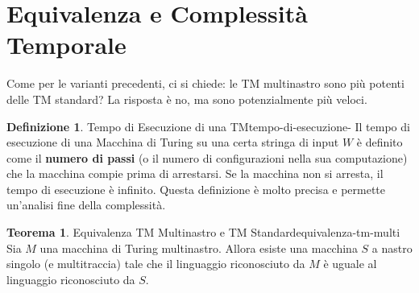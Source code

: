 \documentclass[a4paper]{article}
\theoremstyle{definition} %
\newtheorem{theorem}{Teorema}
\newtheorem{definition}{Definizione}
\begin{document}
\section{Equivalenza e Complessità Temporale}
Come per le varianti precedenti, ci si chiede: le TM multinastro sono più potenti delle TM standard? La risposta è no, ma sono potenzialmente più veloci.

\begin{definition}{Tempo di Esecuzione di una TM}{tempo-di-esecuzione-}
Il tempo di esecuzione di una Macchina di Turing su una certa stringa di input $W$ è definito come il \textbf{numero di passi} (o il numero di configurazioni nella sua computazione) che la macchina compie prima di arrestarsi. Se la macchina non si arresta, il tempo di esecuzione è infinito. Questa definizione è molto precisa e permette un'analisi fine della complessità.
\end{definition}

\begin{theorem}{Equivalenza TM Multinastro e TM Standard}{equivalenza-tm-multi}
Sia $M$ una macchina di Turing multinastro. Allora esiste una macchina $S$ a nastro singolo (e multitraccia) tale che il linguaggio riconosciuto da $M$ è uguale al linguaggio riconosciuto da $S$.
\end{theorem}
\end{document}
